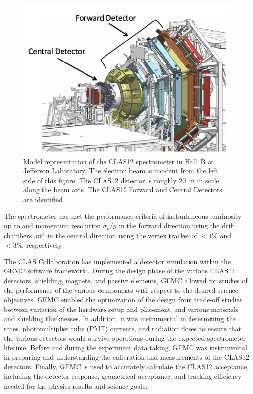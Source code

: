 \begin{figure}
	\centering
	\includegraphics[width=1.0\columnwidth,keepaspectratio]{img/clas12-model.png}
	\caption{ Model representation of the CLAS12 spectrometer in Hall~B at Jefferson Laboratory. The electron
              beam is incident from the left side of this figure. The CLAS12 detector is roughly 20~m in scale along the
              beam axis. The CLAS12 Forward and Central Detectors are identified.}
        \label{fig:clas12-model}
\end{figure}

The spectrometer has met the performance criteria of instantaneous luminosity up
to \cLuminosity and momentum resolution $\sigma_p/p$ in the forward direction using the drift chambers and in the central
direction using the vertex tracker of $< 1\%$ and $< 3\%$, respectively.

The CLAS Collaboration has implemented a detector simulation within the GEMC software framework \cite{GEMC}.
During the design phase of the various CLAS12 detectors, shielding, magnets, and passive elements, GEMC allowed for
studies of the performance of the various components with respect to the desired science objectives. GEMC enabled
the optimization of the design from trade-off studies between variation of the hardware setup and placement, and
various materials and shielding thicknesses. In addition, it was instrumental in determining the rates, photomultiplier
tube (PMT) currents, and radiation doses to ensure that the various detectors would survive operations during the
expected spectrometer lifetime. Before and during the experiment data taking, GEMC was instrumental in preparing
and understanding the calibration and measurements of the CLAS12 detectors. Finally, GEMC is used to accurately
calculate the CLAS12 acceptance, including the detector response, geometrical acceptance, and tracking efficiency
needed for the physics results and science goals.

